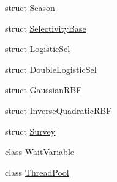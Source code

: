 \begin{DoxyCompactItemize}
struct \hyperlink{structmas_1_1_season}{Season}
\item 
struct \hyperlink{structmas_1_1_selectivity_base}{Selectivity\-Base}
\item 
struct \hyperlink{structmas_1_1_logistic_sel}{Logistic\-Sel}
\item 
struct \hyperlink{structmas_1_1_double_logistic_sel}{Double\-Logistic\-Sel}
\item 
struct \hyperlink{structmas_1_1_gaussian_r_b_f}{Gaussian\-R\-B\-F}
\item 
struct \hyperlink{structmas_1_1_inverse_quadratic_r_b_f}{Inverse\-Quadratic\-R\-B\-F}
\item 
struct \hyperlink{structmas_1_1_survey}{Survey}
\item 
class \hyperlink{classmas_1_1_wait_variable}{Wait\-Variable}
\item 
class \hyperlink{classmas_1_1_thread_pool}{Thread\-Pool}
\end{DoxyCompactItemize}
